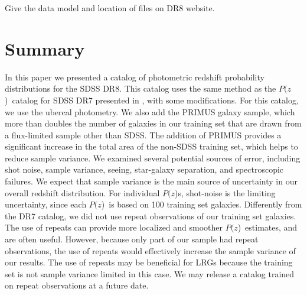 \documentclass[preprint]{aastex}
\newcommand{\pofz}{$P(z$)}
\begin{document}
{\color{red} Give the data model and location  of files on DR8 website. }

\section{Summary} \label{sec:summary}

In this paper we presented a catalog of photometric redshift probability distributions for
the SDSS DR8.  This catalog uses the same method as the \pofz\ catalog for SDSS
DR7 presented in \cite{CunhaPhotoz09}, with some modifications.  For this
catalog, we use the ubercal photometry.  We also add the PRIMUS galaxy sample,
which more than doubles the number of galaxies in our training set that are
drawn from a flux-limited sample other than SDSS.  The addition of PRIMUS
provides a significant increase in the total area of the non-SDSS training set, which
helps to reduce sample variance.  We examined several potential sources of
error, including shot noise, sample variance, seeing, star-galaxy separation,
and spectroscopic failures.  We expect that sample variance is the main source
of uncertainty in our overall redshift distribution.  For individual \pofz s,
shot-noise is the limiting uncertainty, since each \pofz\ is based on 100 training set galaxies.  
Differently from the DR7 catalog, we
did not use repeat observations of our training set galaxies.  The use of
repeats can provide more localized and smoother \pofz\ estimates, and are often
useful.  However, because only part of our sample had repeat observations, the
use of repeats would effectively increase the sample variance of our results.
The use of repeats may be beneficial for LRGs because the training set is not
sample variance limited in this case.  We may release a catalog trained on
repeat observations at a future date.  
\end{document}
